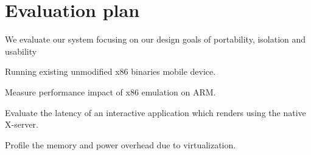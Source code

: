 \section{Evaluation plan}
We evaluate our system focusing on our design goals of portability, isolation and usability
	\begin{itemize*}
	\item Running existing unmodified x86 binaries mobile device.
	\item Measure performance impact of x86 emulation on ARM.
	\item Evaluate the latency of an interactive application which renders using the native X-server.
  \item Profile the memory and power overhead due to virtualization.
	\end{itemize*}

